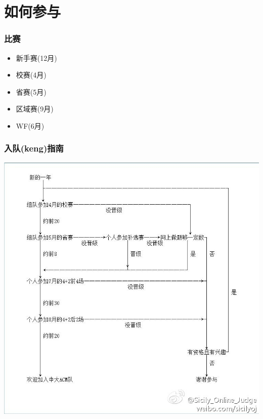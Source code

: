 \documentclass[slidestop,compress,mathserif]{beamer}
\begin{document}
  \section{如何参与}
  \begin{frame}
    \frametitle{比赛}
    \begin{itemize}
      \item 新手赛(12月)
      \item 校赛(4月)
      \item 省赛(5月)
      \item 区域赛(9月)
      \item WF(6月)
    \end{itemize}
  \end{frame}
  \begin{frame}
    \frametitle{入队(keng)指南}
    \includegraphics[scale=0.4]{guide.jpg}
  \end{frame}
\end{document}
